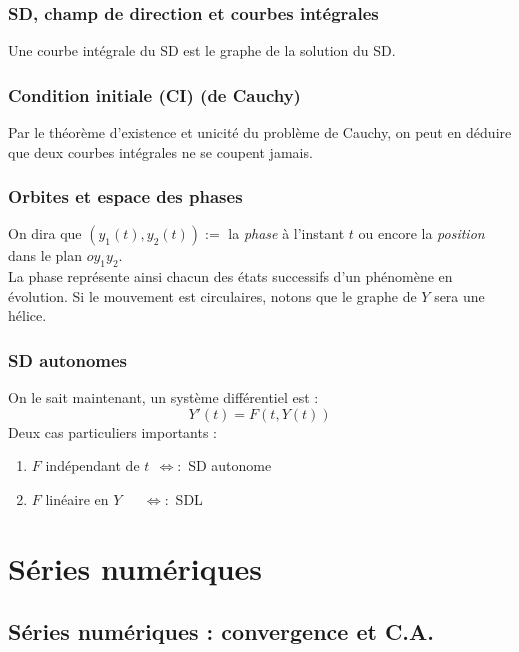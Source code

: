 \documentclass	[11pt, a4paper, openany]{book}
\begin{document}
\subsection{SD, champ de direction et courbes intégrales}
Une courbe intégrale du SD est le graphe de la solution du SD.

\subsection{Condition initiale (CI) (de Cauchy)}
Par le théorème d'existence et unicité du problème de Cauchy, on peut en déduire que deux courbes intégrales ne se coupent jamais.

\subsection{Orbites et espace des phases}
On dira que $(y_1(t), y_2(t)) :=$ la \textit{phase} à l'instant $t$ ou encore la \textit{position} dans le plan $oy_1y_2$.\\
La phase représente ainsi chacun des états successifs d'un phénomène en évolution. Si le mouvement est circulaires, notons que le graphe de $Y$ sera une hélice.

\subsection{SD autonomes}
On le sait maintenant, un système différentiel est :
\begin{equation}
Y'(t) = F(t, Y(t))
\end{equation}
Deux cas particuliers importants : 
\begin{enumerate}
\item $F$ indépendant de $t\ \ \Leftrightarrow : $ SD autonome
\item $F$ linéaire en $Y\ \ \ \ \ \ \ \Leftrightarrow : $ SDL
\end{enumerate}













\setcounter{chapter}{10}
\chapter{Séries numériques}
\section{Séries numériques : convergence et C.A.}
\end{document}
